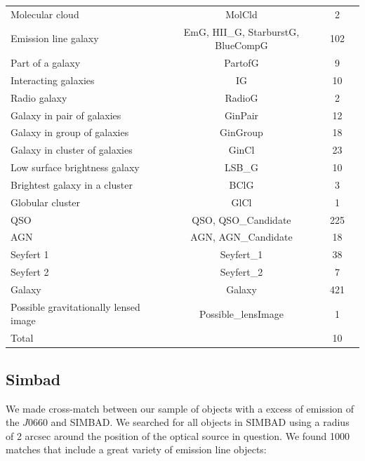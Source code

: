 \documentclass[fleqn,usenatbib]{mnras}
\begin{document}
{\begin{table}
\begin{tabular}{lccc}
Molecular cloud             & MolCld                 & 2                 \\
Emission line galaxy        & EmG, HII\_G, StarburstG, BlueCompG & 102   \\
Part of a galaxy            & PartofG                & 9                 \\
Interacting galaxies        & IG                     & 10                \\
Radio galaxy                & RadioG                 & 2                 \\
Galaxy in pair of galaxies      & GinPair            & 12                \\
Galaxy in group of galaxies     & GinGroup           & 18                \\
Galaxy in cluster of galaxies   & GinCl              & 23                \\
Low surface brightness galaxy   & LSB\_G             & 10                \\
Brightest galaxy in a cluster   & BClG               & 3                 \\
Globular cluster            & GlCl                   & 1                 \\
QSO                         & QSO, QSO\_Candidate    & 225               \\
AGN                         & AGN, AGN\_Candidate    & 18                \\
Seyfert 1                   & Seyfert\_1             & 38                \\
Seyfert 2                   & Seyfert\_2             & 7                 \\
Galaxy                      &  Galaxy                & 421               \\
Possible gravitationally lensed image & Possible\_lensImage & 1          \\
\hline
Total                       &                               & 10         \\
\hline
\end{tabular}
\end{table}

\subsection{Simbad}

We made cross-match between our sample of objects with a excess of emission of
the $J$0660 and SIMBAD. We searched for all objects in SIMBAD using a radius of 2 arcsec
around the position of the optical source in question. We found 1000
matches that include a great variety of emission line objects:

}
\end{document}
